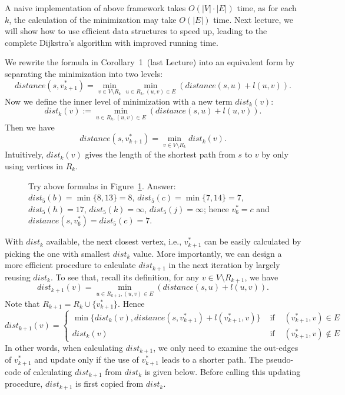 \begin{minipage}{0.8\textwidth}
	\xxx
	\xxx
	\xxx
	\xxx
	\xxx
	\xxx
	\xxx
	\xxx
	\xxx
\end{minipage}

A naive implementation of above framework takes $O(|V|\cdot|E|)$ time,
as for each $k$, the calculation of the minimization may take $O(|E|)$ time.
Next lecture, we will show how to use efficient data structures to speed up,
leading to the complete Dijkstra's algorithm with improved running time.

We rewrite the formula in Corollary~1~(last Lecture) into an equivalent form by separating the minimization into two levels:
$$distance(s, v_{k+1}^*) = \textstyle \min_{v\in V\setminus R_k} \min_{u\in R_k, (u, v)\in E} (distance(s, u) + l(u,v)).$$
Now we define the inner level of minimization with a new term $dist_k(v)$:
$$dist_k(v) := \textstyle \min_{u\in R_k, (u, v)\in E} (distance(s, u) + l(u,v)).$$
Then we have 
$$distance(s, v_{k+1}^*) = \textstyle \min_{v\in V\setminus R_k} dist_k(v).$$
Intuitively, $dist_k(v)$ gives the length of the shortest path from $s$ to $v$ by only using vertices in $R_k$.

\begin{figure}[h]
\centering{}
\caption{Try above formulas in Figure~\ref{fig:extension}.
Answer: $dist_5(b) = \min\{8, 13\} = 8$, $dist_5(c) = \min\{7, 14\} = 7$, $dist_5(h) = 17$, $dist_5(k) = \infty$, $dist_5(j) = \infty$;
hence $v_6^* = c$ and $distance(s,v_6^*) = dist_5(c) = 7$.}
\label{fig:extension}
\end{figure}

With $dist_k$ available, the next closest vertex, i.e., $v_{k+1}^*$ can be easily calculated
by picking the one with smallest $dist_k$ value.
More importantly, we can design a more efficient procedure
to calculate $dist_{k+1}$ in the next iteration by largely reusing $dist_k$.
To see that, recall its definition, for any $v\in V\setminus R_{k+1}$, we have 
$$dist_{k+1}(v) = \textstyle \min_{u\in R_{k+1}, (u, v)\in E} (distance(s, u) + l(u,v)).$$
Note that $R_{k+1} = R_k \cup \{v_{k+1}^*\}$. Hence
\begin{displaymath}
dist_{k+1}(v) = \left\{
\begin{array}{llllll}
\min\{ dist_k(v), distance(s, v_{k+1}^*) + l(v_{k+1}^*, v) \} & \textrm{ if } & (v_{k+1}^*, v) \in E \\
dist_k(v) & \textrm{ if } & (v_{k+1}^*, v) \not\in E
\end{array}
\right.
\end{displaymath}
In other words, when calculating $dist_{k+1}$, we only need to examine the out-edges of $v_{k+1}^*$
and update only if the use of $v_{k+1}^*$ leads to a shorter path. The pseudo-code of
calculating $dist_{k+1}$ from $dist_k$ is given below.
Before calling this updating procedure, $dist_{k+1}$ is first copied from $dist_k$.


